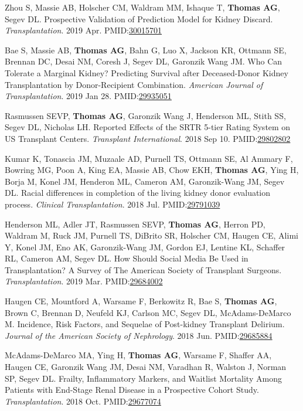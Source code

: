 \documentclass[10pt]{article}
\makeatletter
\newlength{\bibhang}
\newlength{\bibsep}
 {\@listi \global\bibsep\itemsep \global\advance\bibsep by\parsep}
\newenvironment{bibenum*}
  {\renewcommand\labelenumi{[\theenumi]}%
   \etaremune[
     topsep=0pt,
     itemsep=\bibsep,
     parsep=0pt,partopsep=0pt,
     itemindent=-\bibhang,
     leftmargin={\bibhang+\widthof{[999]}}]}
  {\endetaremune}
\newcommand{\pmid}[1]{PMID:\href{https://www.ncbi.nlm.nih.gov/pubmed/#1}{#1}}
\makeatother
\begin{document}
\begin{bibenum*}
\item Zhou S, Massie AB, Holscher CM, Waldram MM, Ishaque T,
  \textbf{Thomas AG}, Segev DL. Prospective Validation of Prediction
  Model for Kidney Discard.
  \emph{Transplantation}. 2019 Apr.
  \pmid{30015701} 

\item Bae S, Massie AB, \textbf{Thomas AG}, Bahn G, Luo X, Jackson KR,
  Ottmann SE, Brennan DC, Desai NM, Coresh J, Segev DL, Garonzik Wang JM.
  Who Can Tolerate a Marginal Kidney? Predicting Survival after
  Deceased-Donor Kidney Transplantation by Donor-Recipient Combination.
  \emph{American Journal of Transplantation}. 2019 Jan 28.
  \pmid{29935051} 

\item Rasmussen SEVP, \textbf{Thomas AG}, Garonzik Wang J,
  Henderson ML, Stith SS, Segev DL, Nicholas LH. Reported Effects
  of the SRTR 5-tier Rating System on US Transplant Centers.
  \emph{Transplant International}. 2018 Sep 10.
  \pmid{29802802} 

\item Kumar K, Tonascia JM, Muzaale AD, Purnell TS, Ottmann SE,
  Al Ammary F, Bowring MG, Poon A, King EA, Massie AB, Chow EKH,
  \textbf{Thomas AG}, Ying H, Borja M, Konel JM, Henderon ML,
  Cameron AM, Garonzik-Wang JM, Segev DL. Racial differences in
  completion of the living kidney donor evaluation process.
  \emph{Clinical Transplantation}. 2018 Jul.
  \pmid{29791039} 

\item Henderson ML, Adler JT, Rasmussen SEVP, \textbf{Thomas AG},
  Herron PD, Waldram M, Ruck JM, Purnell TS, DiBrito SR, Holscher CM,
  Haugen CE, Alimi Y, Konel JM, Eno AK, Garonzik-Wang JM, Gordon EJ,
  Lentine KL, Schaffer RL, Cameron AM, Segev DL.
  How Should Social Media Be Used in Transplantation?
  A Survey of The American Society of Transplant Surgeons.
  \emph{Transplantation}. 2019 Mar.
  \pmid{29684002} 

\item Haugen CE, Mountford A, Warsame F, Berkowitz R, Bae S,
  \textbf{Thomas AG}, Brown C, Brennan D, Neufeld KJ, Carlson MC,
  Segev DL, McAdams-DeMarco M.
  Incidence, Risk Factors, and Sequelae of Post-kidney Transplant Delirium.
  \emph{Journal of the American Society of Nephrology}. 2018 Jun.
  \pmid{29685884} 

\item McAdams-DeMarco MA, Ying H, \textbf{Thomas AG}, Warsame F,
  Shaffer AA, Haugen CE, Garonzik Wang JM, Desai NM, Varadhan R,
  Walston J, Norman SP, Segev DL. Frailty, Inflammatory Markers, and
  Waitlist Mortality Among Patients with End-Stage Renal Disease in a
  Prospective Cohort Study.
  \emph{Transplantation}. 2018 Oct.
  \pmid{29677074} 


\end{bibenum*}
\end{document}
